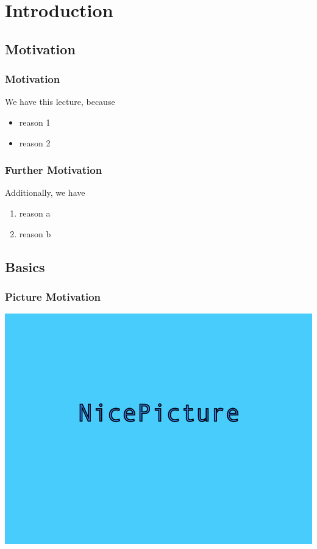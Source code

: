 \section{Introduction}
\frame{\tableofcontents[sectionstyle=show/show,subsectionstyle=show/show/hide]}
\frame{\tableofcontents[sectionstyle=show/hide,subsectionstyle=show/show/hide]}
\subsection{Motivation}
\frame{\tableofcontents[sectionstyle=show/hide,subsectionstyle=show/shaded/hide]}

\begin{frame}[fragile]
\frametitle{Motivation}
We have this lecture, because


\begin{itemize}
  \item reason 1


  \item reason 2


\end{itemize}
\end{frame}

\begin{frame}[fragile]
\frametitle{Further Motivation}
Additionally, we have


\begin{enumerate}
  \item reason a


  \item reason b


\end{enumerate}
\end{frame}
\subsection{Basics}
\frame{\tableofcontents[sectionstyle=show/hide,subsectionstyle=show/shaded/hide]}

\begin{frame}[fragile]
\frametitle{Picture Motivation}
\centerline{\includegraphics[width=0.9\columnwidth]{./picture.png}}



\end{frame}

